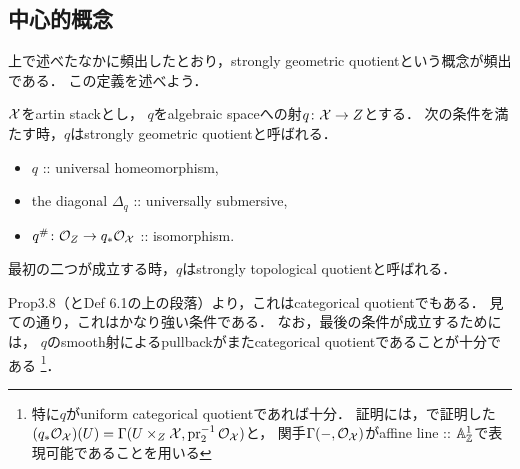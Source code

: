     \subsection{中心的概念}
    上で述べたなかに頻出したとおり，strongly geometric quotientという概念が頻出である．
    この定義を述べよう．
    \begin{Def}
        $\mathcal{X}$をartin stackとし，
        $q$をalgebraic spaceへの射$q \colon \mathcal{X} \to Z$とする．
        次の条件を満たす時，$q$はstrongly geometric quotientと呼ばれる．
        \begin{itemize}
            \item $q$ :: universal homeomorphism,
            \item the diagonal $\Delta_q$ :: universally submersive,
            \item $q^{\#} \colon \mathcal{O}_{Z} \to q_*\mathcal{O}_{\mathcal{X}}$ :: isomorphism.
        \end{itemize}
        最初の二つが成立する時，$q$はstrongly topological quotientと呼ばれる．
    \end{Def}
    \cite{Rydh13} Prop3.8（とDef 6.1の上の段落）より，これはcategorical quotientでもある．
    見ての通り，これはかなり強い条件である．
    なお，最後の条件が成立するためには，
    $q$のsmooth射によるpullbackがまたcategorical quotientであることが十分である
    \footnote
    {
        特に$q$がuniform categorical quotientであれば十分．
        証明には，\cite{SAAlgSt}で証明した
        $(q_*\mathcal{O}_{\mathcal{X}})(U)=\Gamma(U \times_{Z} \mathcal{X}, \operatorname{pr}_2^{-1}\mathcal{O}_{\mathcal{X}})$と，
        関手$\Gamma(-, \mathcal{O}_{\mathcal{X}})$がaffine line :: $\mathbb{A}_{\mathbb{Z}}^1$で表現可能であることを用いる
    }．




